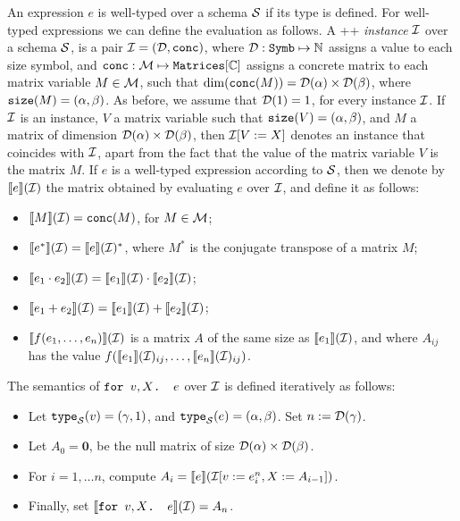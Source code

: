 An expression $e$ is well-typed over a schema $\mathcal{S}$ if its type is defined. For well-typed expressions we can define the evaluation as follows.
%
A \lang++ {\em instance} $\mathcal{I}$ over a schema $\mathcal{S}$, is a pair $\mathcal{I} = (\mathcal{D},\texttt{conc})$, where $\mathcal{D} : \texttt{Symb} \mapsto \mathbb{N}$ assigns a value to each size symbol, and $\texttt{conc} : \mathcal{M} \mapsto \texttt{Matrices}[\mathbb{C}]$ assigns a concrete matrix to each matrix variable $M\in \mathcal{M}$, such that $\dim(\texttt{conc}(M)) = \mathcal{D}(\alpha)\times \mathcal{D}(\beta)$, where $\texttt{size}(M) = (\alpha,\beta)$. As before, we assume that $\mathcal{D}(1) = 1$, for every instance $\mathcal{I}$. 
If $\mathcal{I}$ is an instance, $V$ a matrix variable such that $\texttt{size}(V)= (\alpha,\beta)$, and $M$ a matrix of dimension $\mathcal{D}(\alpha)\times \mathcal{D}(\beta)$, then $\mathcal{I}[V := X]$ denotes an instance that coincides with $\mathcal{I}$, apart from the fact that the value of the matrix variable $V$ is the matrix $M$. 
If $e$ is a well-typed expression according to $\mathcal{S}$, then we denote by $\llbracket e \rrbracket(\mathcal{I})$ the matrix obtained by evaluating $e$ over $\mathcal{I}$, and define it as follows:
\begin{itemize}
\item $\llbracket M \rrbracket(\mathcal{I}) = \texttt{conc}(M)$, for $M\in \mathcal{M}$;
\item $\llbracket e^* \rrbracket(\mathcal{I}) = \llbracket e \rrbracket(\mathcal{I})^*$, where $M^*$ is the conjugate transpose of a matrix $M$;
\item $\llbracket e_1\cdot e_2 \rrbracket(\mathcal{I}) = \llbracket e_1 \rrbracket(\mathcal{I}) \cdot \llbracket e_2 \rrbracket(\mathcal{I})$;
\item $\llbracket e_1 + e_2 \rrbracket(\mathcal{I}) = \llbracket e_1 \rrbracket(\mathcal{I}) + \llbracket e_2 \rrbracket(\mathcal{I})$;
\item $\llbracket f(e_1,\ldots ,e_n) \rrbracket(\mathcal{I})$ is a matrix $A$ of the same size as $\llbracket e_1 \rrbracket(\mathcal{I})$, and where $A_{ij}$ has the value $f(\llbracket e_1 \rrbracket(\mathcal{I})_{ij},\ldots ,\llbracket e_n \rrbracket(\mathcal{I})_{ij})$.
\end{itemize}

The semantics of $\texttt{for }v,X \texttt{. }e$ over $\mathcal{I}$ is defined iteratively as follows:
\begin{itemize}
\item Let $\texttt{type}_{\mathcal{S}}(v)= (\gamma,1)$, and $\texttt{type}_{\mathcal{S}}(e) = (\alpha,\beta)$. Set $n := \mathcal{D}(\gamma)$.
\item Let $A_0 = \mathbf{0}$, be the null matrix of size $\mathcal{D}(\alpha)\times \mathcal{D}(\beta)$.
\item For $i=1,\ldots n$, compute $A_i = \llbracket e \rrbracket(\mathcal{I}[v := e^{n}_i, X:= A_{i-1}])$.
\item Finally, set $\llbracket \texttt{for }v,X \texttt{. }e \rrbracket(\mathcal{I}) = A_{n}$.
\end{itemize}

